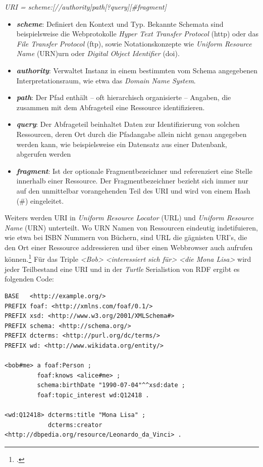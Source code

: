 \documentclass[12pt,a4paper]{article}
\begin{document}
\begin{center}
\textit{URI = scheme:[//authority]path[?query][\#fragment]}
\\
\end{center}


\begin{itemize}
\item \textbf{\textit{scheme}}: Definiert den Kontext und Typ. Bekannte Schemata sind beispielsweise die Webprotokolle \textit{Hyper Text Transfer Protocol} (http) oder das \textit{File Transfer Protocol} (ftp), sowie Notationskonzepte wie \textit{Uniform Resource Name} (URN)urn oder \textit{Digital Object Identifier} (doi).
\item \textbf{\textit{authority}}: Verwaltet Instanz in einem bestimmten vom Schema angegebenen Interpretationsraum, wie etwa das \textit{Domain Name System}.
\item \textbf{\textit{path}}: Der Pfad enthält – oft hierarchisch organisierte – Angaben, die zusammen mit dem Abfrageteil eine Ressource identifizieren. 
\item \textbf{\textit{query}}: Der Abfrageteil beinhaltet Daten zur Identifizierung von solchen Ressourcen, deren Ort durch die Pfadangabe allein nicht genau angegeben werden kann, wie beispielsweise ein Datensatz aus einer Datenbank, abgerufen werden
\item \textbf{\textit{fragment}}: Ist der optionale Fragmentbezeichner und referenziert eine Stelle innerhalb einer Ressource. Der Fragmentbezeichner bezieht sich immer nur auf den unmittelbar vorangehenden Teil des URI und wird von einem Hash (\#) eingeleitet.
\end{itemize}

Weiters werden URI in \textit{Uniform Resource Locator} (URL) und \textit{Uniform Resource Name} (URN) unterteilt. Wo URN Namen von Ressourcen eindeutig indetifuieren, wie etwa bei ISBN Nummern von Büchern, sind URL die gägnisten URI's, die den Ort einer Ressource addressieren und über einen Webbrowser auch aufrufen können.\footcite[Vgl.][S.21-22]{powers2003practical} Für das Triple \textit{<Bob>} \textit{<interessiert sich für>} \textit{<die Mona Lisa>} wird jeder Teilbestand eine URI und in der \textit{Turtle} Serialistion von RDF ergibt es folgenden Code:
\begin{lstlisting}[]
BASE   <http://example.org/>
PREFIX foaf: <http://xmlns.com/foaf/0.1/>
PREFIX xsd: <http://www.w3.org/2001/XMLSchema#>
PREFIX schema: <http://schema.org/>
PREFIX dcterms: <http://purl.org/dc/terms/>
PREFIX wd: <http://www.wikidata.org/entity/>

<bob#me> a foaf:Person ;
         foaf:knows <alice#me> ;
         schema:birthDate "1990-07-04"^^xsd:date ;
         foaf:topic_interest wd:Q12418 .
 
<wd:Q12418> dcterms:title "Mona Lisa" ;
            dcterms:creator <http://dbpedia.org/resource/Leonardo_da_Vinci> .
\end{lstlisting}
\end{document}
